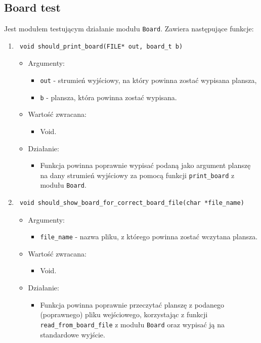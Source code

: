 \documentclass[a4paper,11pt, notitlepage ]{article}
\begin{document}
\subsection{Board test}
Jest modułem testującym działanie modułu \verb+Board+. Zawiera następujące funkcje:
\begin{enumerate}

\item \begin{verbatim} void should_print_board(FILE* out, board_t b) \end{verbatim}
\begin{itemize}
\item Argumenty:
\begin{itemize}
\item \verb+out+ - strumień wyjściowy, na który powinna zostać wypisana plansza,
\item \verb+b+ - plansza, która powinna zostać wypisana.
\end{itemize}
\item Wartość zwracana:
\begin{itemize}
\item Void.
\end{itemize}
\item Działanie:
\begin{itemize}
\item Funkcja powinna poprawnie wypisać podaną jako argument planszę na dany strumień wyjściowy za pomocą funkcji \verb+print_board+ z modułu \verb+Board+. 
\end{itemize}
\end{itemize}


\item \begin{verbatim} void should_show_board_for_correct_board_file(char *file_name) \end{verbatim}
\begin{itemize}
\item Argumenty:
\begin{itemize}
\item \verb+file_name+ - nazwa pliku, z którego powinna zostać wczytana plansza. 
\end{itemize}
\item Wartość zwracana:
\begin{itemize}
\item Void.
\end{itemize}
\item Działanie:
\begin{itemize}
\item Funkcja powinna poprawnie przeczytać planszę z podanego (poprawnego) pliku wejściowego, korzystając z funkcji \verb+read_from_board_file+ z modułu \verb+Board+ oraz wypisać ją na standardowe wyjście.
\end{itemize}
\end{itemize}



\end{enumerate}
\end{document}
